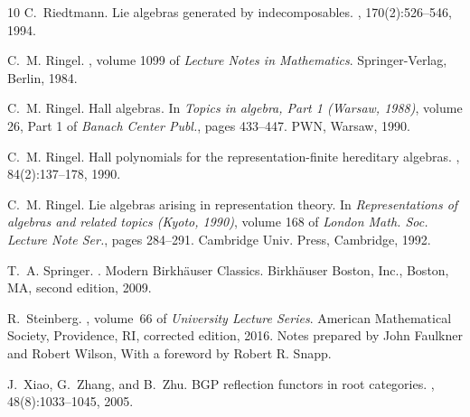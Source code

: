 \documentclass[12pt]{amsart}
\begin{document}
\begin{thebibliography}{10}
C.~Riedtmann.
\newblock Lie algebras generated by indecomposables.
, 170(2):526--546, 1994.

C.~M. Ringel.
, volume 1099 of {\em
  Lecture Notes in Mathematics}.
\newblock Springer-Verlag, Berlin, 1984.

C.~M. Ringel.
\newblock Hall algebras.
\newblock In {\em Topics in algebra, {P}art 1 ({W}arsaw, 1988)}, volume 26,
  Part 1 of {\em Banach Center Publ.}, pages 433--447. PWN, Warsaw, 1990.

C.~M. Ringel.
\newblock Hall polynomials for the representation-finite hereditary algebras.
, 84(2):137--178, 1990.

C.~M. Ringel.
\newblock Lie algebras arising in representation theory.
\newblock In {\em Representations of algebras and related topics ({K}yoto,
  1990)}, volume 168 of {\em London Math. Soc. Lecture Note Ser.}, pages
  284--291. Cambridge Univ. Press, Cambridge, 1992.

T.~A. Springer.
.
\newblock Modern Birkh\"auser Classics. Birkh\"auser Boston, Inc., Boston, MA,
  second edition, 2009.

R.~Steinberg.
, volume~66 of {\em University
  Lecture Series}.
\newblock American Mathematical Society, Providence, RI, corrected edition,
  2016.
\newblock Notes prepared by John Faulkner and Robert Wilson, With a foreword by
  Robert R. Snapp.

J.~Xiao, G.~Zhang, and B.~Zhu.
\newblock B{GP} reflection functors in root categories.
, 48(8):1033--1045, 2005.

\end{thebibliography}
\end{document}

